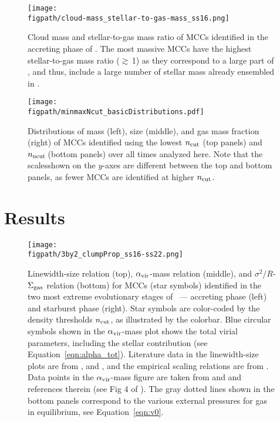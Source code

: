 \IfFileExists{emulateapjlegacy.cls}{\documentclass[iop]{emulateapjlegacy}}{\documentclass[iop]{emulateapj}}
\def\figpath{./Fig}
\begin{document}
\begin{figure}
\centering
\texttt{[image: \\figpath/cloud-mass\_stellar-to-gas-mass\_ss16.png]}
\caption{Cloud mass and stellar-to-gas mass ratio of MCCs identified in the accreting phase of \flower.
The most massive MCCs have the highest stellar-to-gas mass ratio ($\gtrsim$\,1) as they correspond to a large part of \flower, and thus, 
include a large number of stellar mass already ensembled in \flower. 
\label{fig:stellarRatio16}}
\end{figure}


\begin{figure*}[htbp]
\centering
\texttt{[image: \\figpath/minmaxNcut\_basicDistributions.pdf]}
\caption{Distributions of mass (left), size (middle), and gas mass
  fraction (right) of MCCs identified using the lowest $n_{\rm cut}$
  (top panels) and $n_{\rm ncut}$\,\cc (bottom panels)
 over all times analyzed here.
Note that the scalesshown on the $y$-axes are different between the top
and bottom panels, as fewer MCCs are identified at higher $n_{\rm
  cut}$. 
\label{fig:dist}}
\end{figure*}


\section{Results}\label{sec:results}

\begin{figure*}
\centering
\texttt{[image: \\figpath/3by2\_clumpProp\_ss16-ss22.png]}
\caption{
Linewidth-size relation (top), $\alpha_{\rm vir}$-mass relation
(middle), and $\sigma^2/R$-$\Sigma_{\rm gas}$ relation (bottom) for
MCCs (star symbols) identified in the two most extreme evolutionary
stages of \flower\ --- accreting phase (left) and starburst phase
(right). Star symbols are color-coded by the density thresholds
$n_{\rm cut}$, as illustrated by the colorbar.
Blue circular symbols shown in the $\alpha_{\rm vir}$-mass plot shows the total virial parameters, including
the stellar contribution (see Equation~\ref{eqn:alpha_tot}).
Literature data in the linewidth-size plots are from \citet{Heyer04a, Rosolowsky05a, Bolatto08a, 
Leroy15a}, and \citet{Swinbank11a}, and the empirical scaling relations are 
from \citet{Larson81a, Heyer04a, Bolatto08a}.
Data points in the $\alpha_{\rm vir}$-mass figure are taken from
\citet{Kauffmann17a} and \citet{Kauffmann17b} and references therein
(see Fig 4 of \citealt{Kauffmann17b}).   
The gray dotted lines shown in the bottom panels correspond to the various external pressures for 
gas in equilibrium, see Equation~\ref{eqn:v0}.
\label{fig:larsons_single}}
\end{figure*}
\end{document}
